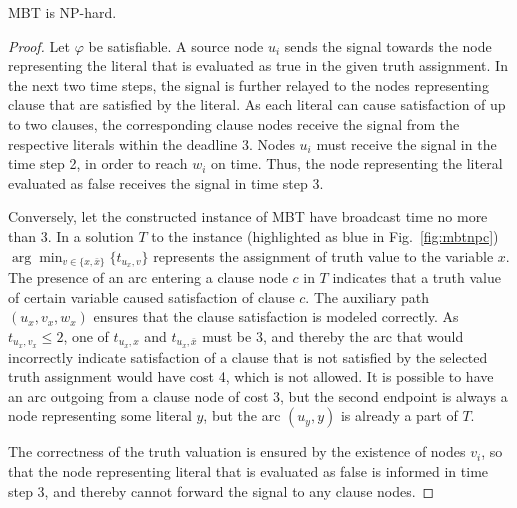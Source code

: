 \begin{proposition}\label{lemma:mbtred}
MBT is NP-hard.
\end{proposition}
\begin{proof}\label{prop:mbtnpc}
Let $\varphi$ be satisfiable.
A source node $u_i$ sends the signal towards the node representing the literal that is evaluated as true in the given truth assignment.
In the next two time steps, the signal is further relayed to the nodes representing clause that are satisfied by the literal.
As each literal can cause satisfaction of up to two clauses, the corresponding clause nodes receive the signal from the respective literals within the deadline 3.
Nodes $u_i$ must receive the signal in the time step 2, in order to reach $w_i$ on time.
Thus, the node representing the literal evaluated as false receives the signal in time step 3.

Conversely, let the constructed instance of MBT have broadcast time no more than 3.
In a solution $T$ to the instance (highlighted as blue in Fig.~\ref{fig:mbtnpc})  $\arg\min_{v\in\{x,\bar{x}\}}\{t_{u_x,v}\}$ represents the assignment of truth value to the variable $x$.
The presence of an arc entering a clause node $c$ in $T$ indicates that a truth value of certain variable caused satisfaction of clause $c$.
The auxiliary path $(u_x,v_x,w_x)$ ensures that the clause satisfaction is modeled correctly.
As $t_{u_x,v_x}\leq 2$, one of $t_{u_x,x}$ and $t_{u_x,\bar{x}}$ must be 3, 
and thereby the arc that would incorrectly indicate satisfaction of a clause that is not satisfied by the selected truth assignment would have cost 4, which is not allowed.
It is possible to have an arc outgoing from a clause node of cost 3, but the second endpoint is always a node representing some literal $y$, but the arc $(u_y,y)$ is already a part of $T$.

The correctness of the truth valuation is ensured by the existence of nodes $v_i$, so that the node representing literal that is evaluated as false is informed in time step 3, 
and thereby cannot forward the signal to any clause nodes.
\end{proof}

